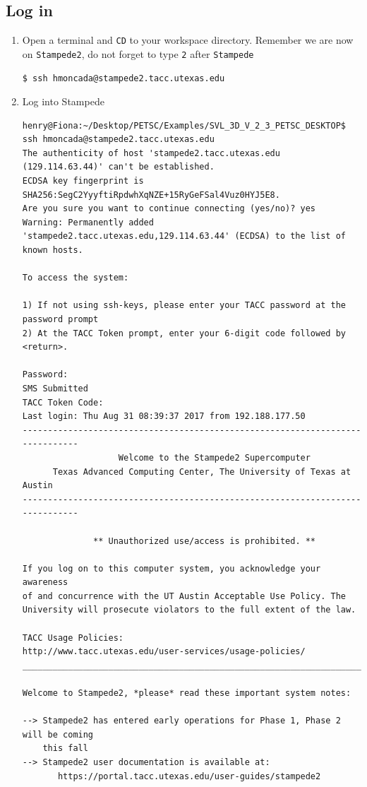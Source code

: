 \documentclass{article}
\begin{document}
\subsection{Log in}
\begin{enumerate}
\item Open a terminal and \verb+CD+ to your workspace directory. Remember we are now on \verb+Stampede2+, do not forget to type \verb+2+ after \verb+Stampede+ 
\scriptsize
\begin{verbatim}
$ ssh hmoncada@stampede2.tacc.utexas.edu
\end{verbatim}
\normalsize
\item Log into Stampede 
\scriptsize
\begin{verbatim}
henry@Fiona:~/Desktop/PETSC/Examples/SVL_3D_V_2_3_PETSC_DESKTOP$ ssh hmoncada@stampede2.tacc.utexas.edu
The authenticity of host 'stampede2.tacc.utexas.edu (129.114.63.44)' can't be established.
ECDSA key fingerprint is SHA256:SegC2YyyftiRpdwhXqNZE+15RyGeFSal4Vuz0HYJ5E8.
Are you sure you want to continue connecting (yes/no)? yes
Warning: Permanently added 'stampede2.tacc.utexas.edu,129.114.63.44' (ECDSA) to the list of known hosts.

To access the system:

1) If not using ssh-keys, please enter your TACC password at the password prompt
2) At the TACC Token prompt, enter your 6-digit code followed by <return>.  

Password: 
SMS Submitted
TACC Token Code:
Last login: Thu Aug 31 08:39:37 2017 from 192.188.177.50
------------------------------------------------------------------------------
                   Welcome to the Stampede2 Supercomputer
      Texas Advanced Computing Center, The University of Texas at Austin
------------------------------------------------------------------------------

              ** Unauthorized use/access is prohibited. **

If you log on to this computer system, you acknowledge your awareness
of and concurrence with the UT Austin Acceptable Use Policy. The
University will prosecute violators to the full extent of the law.

TACC Usage Policies:
http://www.tacc.utexas.edu/user-services/usage-policies/
______________________________________________________________________________

Welcome to Stampede2, *please* read these important system notes:

--> Stampede2 has entered early operations for Phase 1, Phase 2 will be coming
    this fall
--> Stampede2 user documentation is available at:
       https://portal.tacc.utexas.edu/user-guides/stampede2


\end{verbatim}
\end{enumerate}
\end{document}
